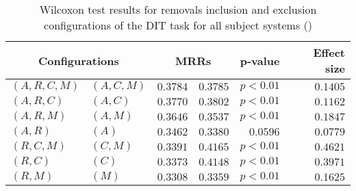 
\begin{table}
\begin{spacing}{1.2}
\centering
\caption{Wilcoxon test results for removals inclusion and exclusion configurations of the DIT task for all subject systems (\ctwo)}
\label{table:versus-wilcox-all-dit-removals}
\begin{tabular}{ll|rr|rr}
\toprule
      \multicolumn{2}{c|}{Configurations} &                \multicolumn{2}{c|}{MRRs} &             p-value & Effect size \\
\midrule
 $(A,R,C,M)$ &  $(A,C,M)$ &       $0.3784$ &  $\bm{0.3785}$ & $p<0.01$ &    $0.1405$ \\
   $(A,R,C)$ &    $(A,C)$ &       $0.3770$ &  $\bm{0.3802}$ & $p<0.01$ &    $0.1162$ \\
   $(A,R,M)$ &    $(A,M)$ &  $\bm{0.3646}$ &       $0.3537$ & $p<0.01$ &    $0.1847$ \\
     $(A,R)$ &      $(A)$ &  $\bm{0.3462}$ &       $0.3380$ & $0.0596$ &    $0.0779$ \\
   $(R,C,M)$ &    $(C,M)$ &       $0.3391$ &  $\bm{0.4165}$ & $p<0.01$ &    $0.4621$ \\
     $(R,C)$ &      $(C)$ &       $0.3373$ &  $\bm{0.4148}$ & $p<0.01$ &    $0.3971$ \\
     $(R,M)$ &      $(M)$ &       $0.3308$ &  $\bm{0.3359}$ & $p<0.01$ &    $0.1625$ \\
\bottomrule
\end{tabular}

\end{spacing}
\end{table}

